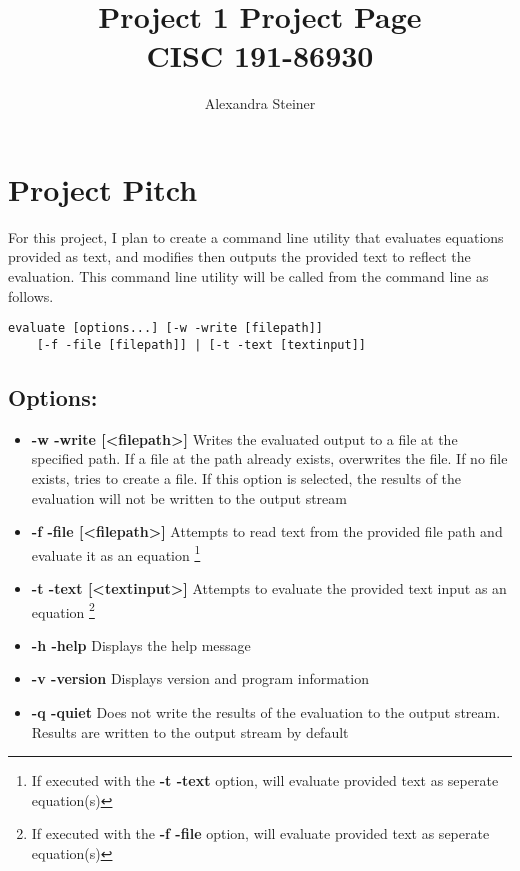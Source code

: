 \documentclass{article}
\title{%
	Project 1 Project Page\\
    \large CISC 191-86930}
\author{Alexandra Steiner}
\begin{document}
\maketitle

\tableofcontents

\newpage

\section{Project Pitch}
For this project, I plan to create a command line utility that evaluates equations provided as text, and modifies then outputs the provided text to reflect the evaluation. This command line utility will be called from the command line as follows.

\begin{lstlisting} 
evaluate [options...] [-w -write [filepath]]
	[-f -file [filepath]] | [-t -text [textinput]] 
\end{lstlisting}

\subsection{Options:}
\begin{itemize}
	\item \textbf{-w -write {[\textless filepath\textgreater]}} Writes the evaluated output to a file at the specified path. If a file at the path already exists, overwrites the file. If no file exists, tries to create a file. If this option is selected, the results of the evaluation will not be written to the output stream
	\item \textbf{-f -file {[\textless filepath\textgreater]}} Attempts to read text from the provided file path and evaluate it as an equation \footnote{If executed with the \textbf{-t -text} option, will evaluate provided text as seperate equation(s)}
	\item \textbf{-t -text {[\textless textinput\textgreater]}} Attempts to evaluate the provided text input as an equation \footnote{If executed with the \textbf{-f -file} option, will evaluate provided text as seperate equation(s)}
	\item \textbf{-h -help} Displays the help message
	\item \textbf{-v -version} Displays version and program information
	\item \textbf{-q -quiet} Does not write the results of the evaluation to the output stream. Results are written to the output stream by default
\end{itemize}
\end{document}

